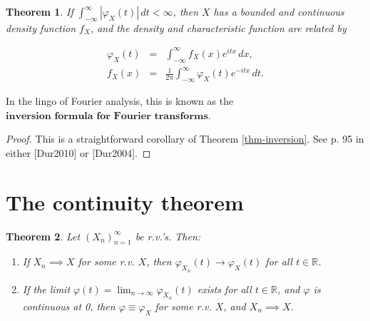 \documentclass[11pt]{report}
\newcommand{\R}{\mathbb{R}}
\theoremstyle{plain}
\newtheorem{thm}{Theorem}[chapter]
\theoremstyle{definition}
\begin{document}
\begin{thm}
If
$\int_{-\infty}^\infty |\varphi_X(t)|\,dt < \infty$,
then $X$ has a bounded and continuous density
function $f_X$, and the density and characteristic
function are related by

\begin{eqnarray*}
\varphi_X(t) &=& \int_{-\infty}^\infty f_X(x) e^{itx}\,dx,  \\
f_X(x) &=& \frac{1}{2\pi} \int_{-\infty}^\infty \varphi_X(t) e^{-itx}\,dt.
\end{eqnarray*}

\end{thm}

In the lingo of Fourier analysis, this is known as
the
$\textbf{inversion formula for Fourier transforms}$.

\begin{proof}
This is a straightforward corollary of Theorem
\ref{thm-inversion}. See p. 95 in either [Dur2010] or
[Dur2004].
\end{proof}

\section{The continuity theorem}

\begin{thm}
\label{thm-continuity}
Let $(X_n)_{n=1}^\infty$ be r.v.'s. Then:

\begin{enumerate}[label=(\roman*)]
\item If $X_n \implies X$ for some r.v. $X$, then
$\varphi_{X_n}(t)\to \varphi_X(t)$ for all $t\in\R$.

\item If the limit
$\varphi(t) = \lim_{n\to\infty} \varphi_{X_n}(t)$
exists for all $t\in\R$, and $\varphi$ is continuous
at 0, then $\varphi\equiv \varphi_X$ for some r.v.
$X$, and $X_n \implies X$.
\end{enumerate}

\end{thm}
\end{document}
